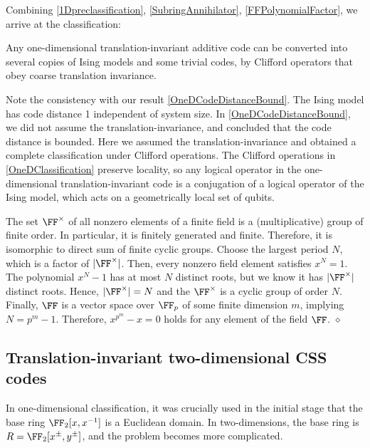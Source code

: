 Combining \ref{1Dpreclassification}, \ref{SubringAnnihilator}, \ref{FFPolynomialFactor},
we arrive at the classification:
\begin{thm}
Any one-dimensional translation-invariant additive code
can be converted into several copies of Ising models
and some trivial codes,
by Clifford operators that obey coarse translation invariance.
\label{OneDClassification}
\end{thm}

Note the consistency with our result \ref{OneDCodeDistanceBound}.
The Ising model has code distance 1
independent of system size.
In \ref{OneDCodeDistanceBound}, we did not assume the translation-invariance,
and concluded that the code distance is bounded.
Here we assumed the translation-invariance and obtained a complete classification
under Clifford operations.
The Clifford operations in \ref{OneDClassification}
preserve locality,
so any logical operator in the one-dimensional translation-invariant code
is a conjugation of a logical operator of the Ising model,
which acts on a geometrically local set of qubits.

\begin{rem}
The set $\FF^\times$ of all nonzero elements of a finite field
is a (multiplicative) group of finite order.
In particular, it is finitely generated and finite.
Therefore, it is isomorphic to direct sum of finite cyclic groups.
Choose the largest period $N$, which is a factor of $|\FF^\times|$.
Then, every nonzero field element satisfies $x^N = 1$.
The polynomial $x^N-1$ has at most $N$ distinct roots,
but we know it has $|\FF^\times|$ distinct roots.
Hence, $|\FF^\times| = N$ and the $\FF^\times$ is a cyclic group of order $N$.
Finally, $\FF$ is a vector space over $\FF_p$ of some finite dimension $m$,
implying $N = p^m -1$.
Therefore, $x^{p^m} -x = 0$ holds for any element of the field $\FF$.
\label{FieldEquation}
\hfill $\diamond$ \end{rem}


\subsection{Translation-invariant two-dimensional CSS codes}

In one-dimensional classification,
it was crucially used in the initial stage 
that the base ring $\FF_2[x, x^{-1}]$ is a Euclidean domain.
In two-dimensions, the base ring is $R = \FF_2 [x^\pm, y^\pm]$,
and the problem becomes more complicated.

